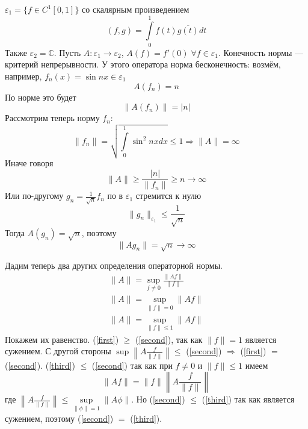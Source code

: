 \documentclass[12pt]{article}
\begin{document}
\begin{Prim}
	$\varepsilon_1 = \{f \in C^1[0,1]\}$ со скалярным произведением
	$$
	(f, g) = \int\limits_0^1 f(t) \overline{g(t)} dt
	$$
	Также $\varepsilon_2 = \mathbb C$.
	Пусть $A : \varepsilon_1 \to \varepsilon_2$, $A(f)=f'(0)\; \forall f \in \varepsilon_1$.
	Конечность нормы --- критерий непрерывности.
	У этого оператора норма бесконечность: возмём, например, $f_n(x) = \sin{nx} 	\in \varepsilon_1$
	$$
	A(f_n) = n
	$$
	По норме это будет
	$$
	\|A(f_n)\| = |n|
	$$
	Рассмотрим теперь норму $f_n$:
	$$
	\|f_n\| = \sqrt{ \int \limits_0^1 \sin^2{nx} dx} \le 1 \Rightarrow \|A\| = \infty
	$$
	Иначе говоря
	$$
	\|A\| \ge \frac{|n|}{\|f_n\|} \ge n \to \infty
	$$
	Или по-другому $g_n = \frac{1}{\sqrt{n}} f_n$ по в $\varepsilon_1$ стремится к 	нулю
	$$
	\|g_n\|_{\varepsilon_1} \le \frac{1}{\sqrt{n}}
	$$
	Тогда $A(g_n) = \sqrt{n}$, поэтому
	$$
	\|Ag_n\| = \sqrt{n} \to \infty
	$$
\end{Prim}

Дадим теперь два других определения операторной нормы.
\begin{gather}
	\label{first}
	\|A\| = \sup\limits_{f \ne 0}{\frac{\|Af\|}{\|f\|}}\\
	\label{second}
	\|A\| = \sup\limits_{\|f\| = 0} \|Af\|\\
	\label{third}
	\|A\| = \sup\limits_{\|f\| \le 1}\|Af\|
\end{gather}
Покажем их равенство.
(\ref{first}) $\ge$ (\ref{second}), так как $\|f\| = 1$ является сужением.
С другой стороны $\sup\left\|A\frac{f}{\|f\|}\right\| \le $ (\ref{second}) $\Rightarrow$  (\ref{first}) $=$ (\ref{second}).
(\ref{third}) $\le$ (\ref{second}) так как при $f \ne 0$ и $\|f\| \le 1$ имеем 
$$
\|Af\| =\|f\| \left\|A\frac{f}{\|f\|}\right\|
$$
где $\left\|A\frac{f}{\|f\|}\right\| \le \sup\limits_{\|\phi\| = 1} \|A\phi\|$.
Но (\ref{second}) $\le$ (\ref{third}) так как является сужением, поэтому (\ref{second}) $=$ (\ref{third}).
\end{document}

